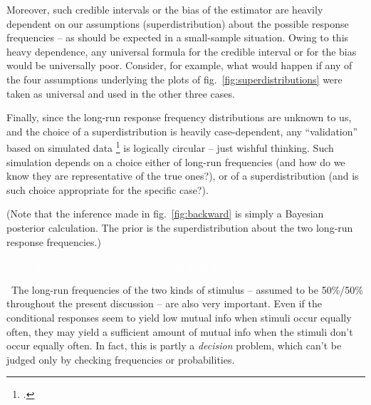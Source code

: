 \documentclass[\ifafour a4paper,12pt,\else a5paper,10pt,\fi%
onecolumn,oneside,article,%
british%
]{memoir}
\makeatletter
\theoremstyle{remark}
\theoremstyle{innote}
\def\sum{\DOTSI\sumop\slimits@}
\newcommand*{\citep}{\footcites}
\newcommand*{\de}{\partialup}%
\newcommand*{\p}{\mathrm{P}}%
\renewcommand*{\|}[1][]{\nonscript\,#1\vert\nonscript\;\mathopen{}}
\newcommand*{\fig}{fig.}%
\newcommand*{\cf}{{cf.}}
\newcommand*{\tsum}{\mathop{\textstyle\sum}\nolimits}
\newcommand*{\puzzle}{{\fontencoding{U}\fontfamily{fontawesometwo}\selectfont\symbol{225}}}
\newcommand{\mynote}[1]{ {\color{notecolour}\puzzle\ #1}}
\makeatother
\begin{document}
Moreover, such credible intervals or the bias of the estimator are heavily
dependent on our assumptions (superdistribution) about the possible
response frequencies -- as should be expected in a small-sample situation.
Owing to this heavy dependence, any universal formula for the credible
interval or for the bias would be universally poor. Consider, for example,
what would happen if any of the four assumptions underlying the plots of
\fig~\ref{fig:superdistributions} were taken as universal and used in the
other three cases.

Finally, since the long-run response frequency distributions are unknown to
us, and the choice of a superdistribution is heavily case-dependent, any
\enquote{validation} based on simulated data \citep[\cf][\emph{Comparing
  procedures to correct for the bias}]{panzerietal2007} is logically
circular -- just wishful thinking. Such simulation depends on a choice either of
long-run frequencies (and how do we know they are representative of the
true ones?), or of a superdistribution (and is such choice appropriate for
the specific case?).


\medskip

(Note that the inference made in \fig~\ref{fig:backward} is simply a
Bayesian posterior calculation. The prior is the superdistribution about
the two long-run response frequencies.)





\textcolor{white}{If you find this you can claim a postcard from me.}

\mynote{The long-run frequencies of the two kinds of stimulus -- assumed to
  be 50\%/50\% throughout the present discussion -- are also very
  important. Even if the conditional responses seem to yield low mutual
  info when stimuli occur equally often, they may yield a sufficient amount
  of mutual info when the stimuli don't occur equally often. In fact, this
  is partly a \emph{decision} problem, which can't be judged only by
  checking frequencies or probabilities.}



\end{document}
